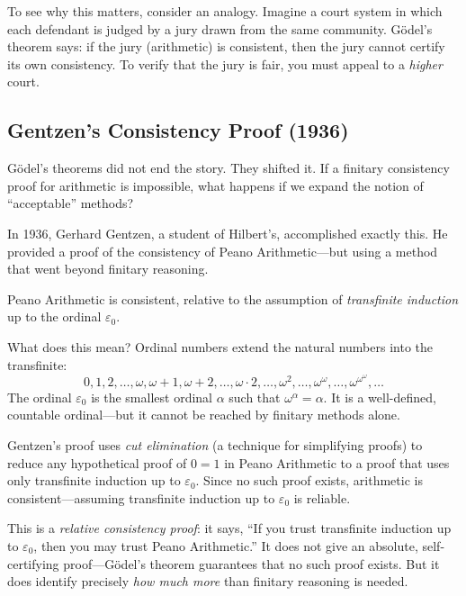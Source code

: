 To see why this matters, consider an analogy. Imagine a court system in which each defendant is judged by a jury drawn from the same community. G\"odel's theorem says: if the jury (arithmetic) is consistent, then the jury cannot certify its own consistency. To verify that the jury is fair, you must appeal to a \emph{higher} court.

\subsection{Gentzen's Consistency Proof (1936)}

G\"odel's theorems did not end the story. They shifted it. If a finitary consistency proof for arithmetic is impossible, what happens if we expand the notion of ``acceptable'' methods?

In 1936, Gerhard Gentzen, a student of Hilbert's, accomplished exactly this. He provided a proof of the consistency of Peano Arithmetic---but using a method that went beyond finitary reasoning.

\begin{proposition}[Gentzen, 1936]
\label{prop:gentzen}
Peano Arithmetic is consistent, relative to the assumption of \emph{transfinite induction} up to the ordinal $\varepsilon_0$.
\end{proposition}

What does this mean? Ordinal numbers extend the natural numbers into the transfinite:
\[
    0, 1, 2, \ldots, \omega, \omega+1, \omega+2, \ldots, \omega \cdot 2, \ldots, \omega^2, \ldots, \omega^\omega, \ldots, \omega^{\omega^\omega}, \ldots
\]
The ordinal $\varepsilon_0$ is the smallest ordinal $\alpha$ such that $\omega^\alpha = \alpha$. It is a well-defined, countable ordinal---but it cannot be reached by finitary methods alone.

Gentzen's proof uses \emph{cut elimination} (a technique for simplifying proofs) to reduce any hypothetical proof of $0 = 1$ in Peano Arithmetic to a proof that uses only transfinite induction up to $\varepsilon_0$. Since no such proof exists, arithmetic is consistent---assuming transfinite induction up to $\varepsilon_0$ is reliable.

This is a \emph{relative consistency proof}: it says, ``If you trust transfinite induction up to $\varepsilon_0$, then you may trust Peano Arithmetic.'' It does not give an absolute, self-certifying proof---G\"odel's theorem guarantees that no such proof exists. But it does identify precisely \emph{how much more} than finitary reasoning is needed.

